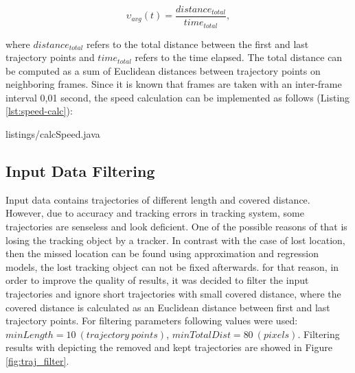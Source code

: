 \begin{equation} \label{eq:avg_speed}
	\upsilon_{avg}(t) = \frac{distance_{total}} {time_{total}},
\end{equation}

where $distance_{total}$ refers to the total distance between the first and last trajectory points and $time_{total}$ refers to the time elapsed. The total distance can be computed as a sum of Euclidean distances between trajectory points on neighboring frames. Since it is known that frames are taken with an inter-frame interval 0,01 second, the speed calculation can be implemented as follows (Listing \ref{lst:speed-calc}):

\lstset{style=code-style-java}
 {listings/calcSpeed.java}

\subsection{Input Data Filtering}

Input data contains trajectories of different length and covered distance. However, due to accuracy and tracking errors in tracking system, some trajectories are senseless and look deficient. One of the possible reasons of that is losing the tracking object by a tracker. In contrast with the case of lost location, then the missed location can be found using approximation and regression models, the lost tracking object can not be fixed afterwards. for that reason, in order to improve the quality of results, it was decided to filter the input trajectories and ignore short trajectories with small covered distance, where the covered distance is calculated as an Euclidean distance between first and last trajectory points. For filtering parameters following values were used: $minLength = 10\ (trajectory\ points)$, $minTotalDist = 80\ (pixels)$. Filtering results with depicting the removed and kept trajectories are showed in Figure \ref{fig:traj_filter}.

